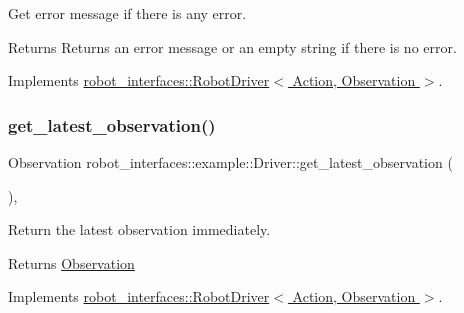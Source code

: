 Get error message if there is any error. 

\begin{DoxyReturn}{Returns}
Returns an error message or an empty string if there is no error. 
\end{DoxyReturn}


Implements \hyperlink{classrobot__interfaces_1_1RobotDriver_acdf4c5d6993b836a180e6b6fc12b3445}{robot\+\_\+interfaces\+::\+Robot\+Driver$<$ Action, Observation $>$}.

\mbox{\label{classrobot__interfaces_1_1example_1_1Driver_a2fa7ee03258e65037ed69d9a8363bfe8}} 
\subsubsection{\texorpdfstring{get\+\_\+latest\+\_\+observation()}{get\_latest\_observation()}}
{\footnotesize\ttfamily Observation robot\+\_\+interfaces\+::example\+::\+Driver\+::get\+\_\+latest\+\_\+observation (\begin{DoxyParamCaption}{ }\end{DoxyParamCaption})\hspace{0.3cm}{\ttfamily [inline]}, {\ttfamily [virtual]}}



Return the latest observation immediately. 

\begin{DoxyReturn}{Returns}
\hyperlink{classrobot__interfaces_1_1example_1_1Observation}{Observation} 
\end{DoxyReturn}


Implements \hyperlink{classrobot__interfaces_1_1RobotDriver_ad13d4f4fdfe78bdde4fc964f07fa45e2}{robot\+\_\+interfaces\+::\+Robot\+Driver$<$ Action, Observation $>$}.

\mbox{\label{classrobot__interfaces_1_1example_1_1Driver_ab6f6c3f3ffb730d162bec70313f8aab7}} 
